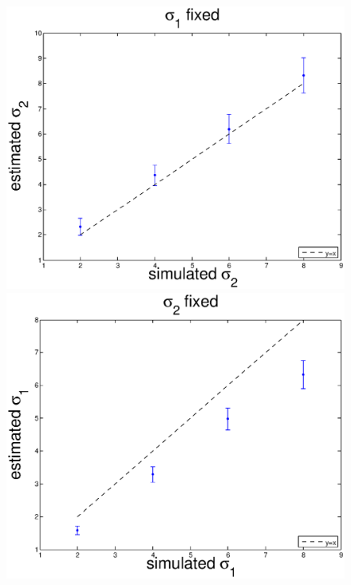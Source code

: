 \documentclass{scrartcl}
\begin{document}
\begin{figure}[H]
  \begin{minipage}[b]{0.3\textwidth}
    \centering
    \includegraphics[scale=0.26]{s1_fixed.eps}
  \end{minipage}
  \quad
  \begin{minipage}[b]{0.3\textwidth}
    \centering
    \includegraphics[scale=0.26]{s2_fixed.eps}
  \end{minipage}
  \quad
  \begin{minipage}[b]{0.3\textwidth}

\end{minipage}
\end{figure}
\end{document}
